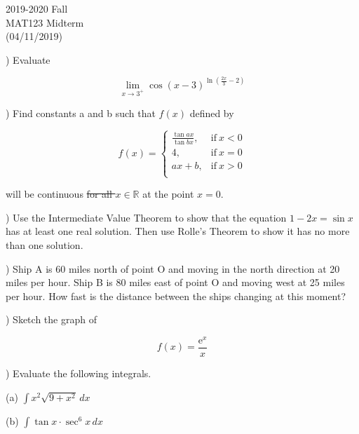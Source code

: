 \documentclass{article}
\begin{document}
\pagestyle{empty}
\large

\begin{center}
2019-2020 Fall\\MAT123 Midterm\\(04/11/2019)
\end{center}

) Evaluate

\begin{equation*}\lim_{x\to3^+}\cos(x-3)^{\ln\left(\frac{2x}{3}-2\right)}\end{equation*}

\hfill

) Find constants a and b such that $f(x)$ defined by

\[
f(x) =
\begin{cases}
\displaystyle \frac{\tan ax}{\tan bx}, & \text{if}\ x < 0 \\
4, & \text{if}\ x = 0 \\
ax+b, & \text{if}\ x >0 \\
\end{cases}
\]

\hfill

\noindent will be continuous \sout{for all $x \in \mathbb{R}$} at the point $x=0$.

\hfill

) Use the Intermediate Value Theorem to show that the equation $1-2x =\sin x$ has at least one real solution. Then use Rolle's Theorem to show it has no more than one solution.

\hfill

) Ship A is 60 miles north of point O and moving in the north direction at 20 miles per hour. Ship B is 80 miles east of point O and moving west at 25 miles per hour. How fast is the distance between the ships changing at this moment?

\hfill

) Sketch the graph of

\begin{equation*} 
f(x) = \frac{\mathrm{e}^x}{x}
\end{equation*}

\hfill

) Evaluate the following integrals.

\noindent (a) $\displaystyle \int x^2\sqrt{9 + x^2}\, dx$

\hfill

\noindent (b) $\displaystyle \int\tan x \cdot\sec^6 x\, dx$
\end{document}
